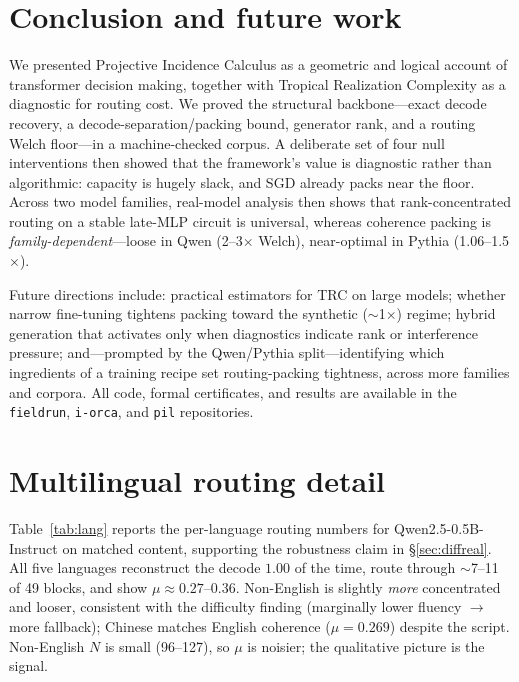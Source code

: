 \documentclass[sigconf,nonacm]{acmart}
\theoremstyle{definition}
\begin{document}
\section{Conclusion and future work}

We presented Projective Incidence Calculus as a geometric and logical account of
transformer decision making, together with Tropical Realization Complexity as a
diagnostic for routing cost. We proved the structural backbone---exact decode
recovery, a decode-separation/packing bound, generator rank, and a routing Welch
floor---in a machine-checked corpus. A deliberate set of four null interventions then
showed that the framework's value is diagnostic rather than algorithmic: capacity is
hugely slack, and SGD already packs near the floor. Across two model families,
real-model analysis then shows that rank-concentrated routing on a stable late-MLP
circuit is universal, whereas coherence packing is \emph{family-dependent}---loose in
Qwen (2--3$\times$ Welch), near-optimal in Pythia (1.06--1.5$\times$).

Future directions include: practical estimators for TRC on large models; whether
narrow fine-tuning tightens packing toward the synthetic ($\sim$1$\times$) regime;
hybrid generation that activates only when diagnostics indicate rank or interference
pressure; and---prompted by the Qwen/Pythia split---identifying which ingredients of
a training recipe set routing-packing tightness, across more families and corpora.
All code, formal certificates, and results are available in the \texttt{fieldrun},
\texttt{i-orca}, and \texttt{pil} repositories.




\appendix

\section{Multilingual routing detail}
\label{app:multilingual}
Table~\ref{tab:lang} reports the per-language routing numbers for
Qwen2.5-0.5B-Instruct on matched content, supporting the robustness claim in
\S\ref{sec:diffreal}. All five languages reconstruct the decode $1.00$ of the time,
route through $\sim$7--11 of 49 blocks, and show $\mu\approx0.27$--0.36. Non-English
is slightly \emph{more} concentrated and looser, consistent with the difficulty
finding (marginally lower fluency $\to$ more fallback); Chinese matches English
coherence ($\mu{=}0.269$) despite the script. Non-English $N$ is small (96--127), so
$\mu$ is noisier; the qualitative picture is the signal.
\end{document}
